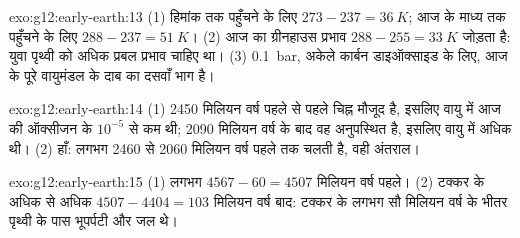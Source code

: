 \begin{solution}{exo:g12:early-earth:13}
(1) हिमांक तक पहुँचने के लिए $273 - 237 = \qty{36}{K}$; आज के माध्य तक पहुँचने के लिए
$288 - 237 = \qty{51}{K}$। (2) आज का ग्रीनहाउस प्रभाव $288 - 255 =
\qty{33}{K}$ जोड़ता है: युवा पृथ्वी को अधिक प्रबल प्रभाव चाहिए था। (3) \qty{0.1}{bar}, अकेले
कार्बन डाइऑक्साइड के लिए, आज के पूरे वायुमंडल के दाब का दसवाँ भाग है।
\end{solution}

\begin{solution}{exo:g12:early-earth:14}
(1) 2450 मिलियन वर्ष पहले से पहले चिह्न मौजूद है, इसलिए वायु में आज की
ऑक्सीजन के $10^{-5}$ से कम थी; 2090 मिलियन वर्ष के बाद वह अनुपस्थित है, इसलिए
वायु में अधिक थी। (2) हाँ:  लगभग 2460 से
2060 मिलियन वर्ष पहले तक चलती है, वही अंतराल।
\end{solution}

\begin{solution}{exo:g12:early-earth:15}
(1) लगभग $4567 - 60 = 4507$ मिलियन वर्ष पहले। (2) टक्कर के अधिक से अधिक $4507 - 4404 =
103$ मिलियन वर्ष बाद: टक्कर के लगभग सौ मिलियन वर्ष के भीतर पृथ्वी के पास
भूपर्पटी और जल थे।
\end{solution}

